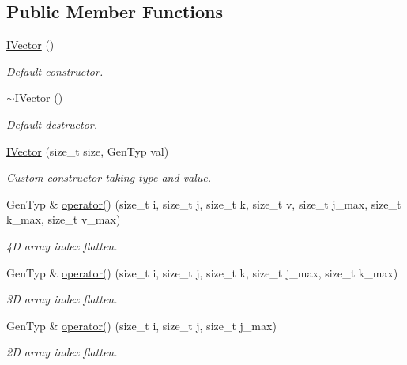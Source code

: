 \subsection*{Public Member Functions}
\begin{DoxyCompactItemize}
\item 
\hyperlink{class_i_vector_aa9e08edf18a107b1512c563f974b84a9}{I\+Vector} ()
\begin{DoxyCompactList}\small\item\em Default constructor. \end{DoxyCompactList}\item 
\hyperlink{class_i_vector_a98498962689499607ff2f3c0dd251c55}{$\sim$\+I\+Vector} ()
\begin{DoxyCompactList}\small\item\em Default destructor. \end{DoxyCompactList}\item 
\hyperlink{class_i_vector_aa20ed511fdb06743b435f23bbf286e8c}{I\+Vector} (size\+\_\+t size, Gen\+Typ val)
\begin{DoxyCompactList}\small\item\em Custom constructor taking type and value. \end{DoxyCompactList}\item 
Gen\+Typ \& \hyperlink{class_i_vector_aecbb48fdf561c44efb89127c77ab11e2}{operator()} (size\+\_\+t i, size\+\_\+t j, size\+\_\+t k, size\+\_\+t v, size\+\_\+t j\+\_\+max, size\+\_\+t k\+\_\+max, size\+\_\+t v\+\_\+max)
\begin{DoxyCompactList}\small\item\em 4D array index flatten. \end{DoxyCompactList}\item 
Gen\+Typ \& \hyperlink{class_i_vector_a975461485fb45bd7e970822800266177}{operator()} (size\+\_\+t i, size\+\_\+t j, size\+\_\+t k, size\+\_\+t j\+\_\+max, size\+\_\+t k\+\_\+max)
\begin{DoxyCompactList}\small\item\em 3D array index flatten. \end{DoxyCompactList}\item 
Gen\+Typ \& \hyperlink{class_i_vector_a506334a0add9a0a79e27a208fda53c0d}{operator()} (size\+\_\+t i, size\+\_\+t j, size\+\_\+t j\+\_\+max)
\begin{DoxyCompactList}\small\item\em 2D array index flatten. \end{DoxyCompactList}\end{DoxyCompactItemize}


